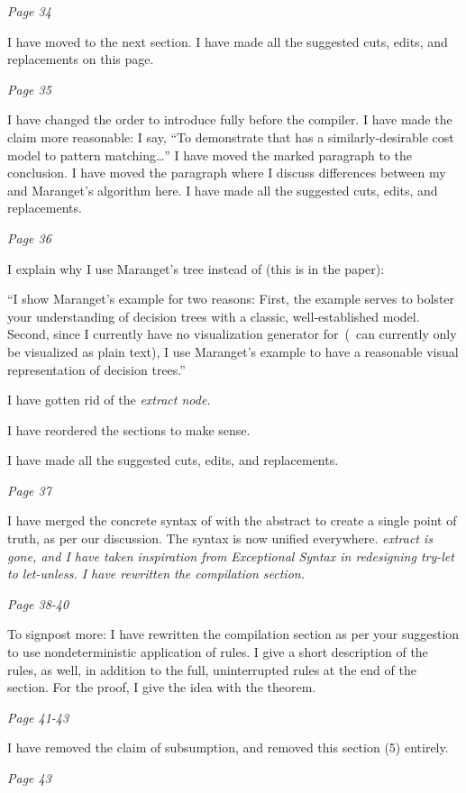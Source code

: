 \documentclass[manuscript,screen, 12pt, nonacm]{acmart}
\begin{document}
\it{Page 34}

I have moved \D to the next section. I have made all the suggested cuts, edits,
and replacements on this page. 

\it{Page 35}

I have changed the order to introduce \D fully before the compiler. I have made
the claim more reasonable: I say, “To demonstrate that \VMinus has a
similarly-desirable cost model to pattern matching\dots” I have moved the marked
paragraph to the conclusion. I have moved the paragraph where I discuss
differences between my and Maranget's algorithm here. I have made all the
suggested cuts, edits, and replacements. 

\it{Page 36}

I explain why I use Maranget's tree instead of \D (this is in the paper): 

“I show Maranget's example for two reasons: First, the example serves to bolster
your understanding of decision trees with a classic, well-established model.
Second, since I currently have no visualization generator for~\D (\D~can
currently only be visualized as plain text), I use Maranget's example to have a
reasonable visual representation of decision trees.”

I have gotten rid of the \it{extract} node. 

I have reordered the sections to make sense. 

I have made all the suggested cuts, edits, and replacements. 

\it{Page 37}

I have merged the concrete syntax of \D with the abstract to create a single
point of truth, as per our discussion.  The syntax is now unified everywhere.
\it{extract} is gone, and I have taken inspiration from \it{Exceptional Syntax}
in redesigning \it{try-let} to \it{let-unless}. I have rewritten the compilation
section. 

\it{Page 38-40}

To signpost more: I have rewritten the compilation section as per your
suggestion to use nondeterministic application of rules. I give a short
description of the rules, as well, in addition to the full, uninterrupted rules
at the end of the section. For the proof, I give the idea with the theorem. 

\it{Page 41-43}

I have removed the claim of subsumption, and removed this section (5) entirely. 

\it{Page 43}
\end{document}
